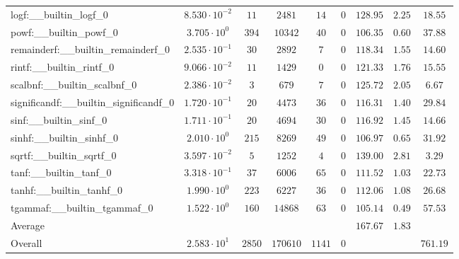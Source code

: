 \begin{tabular}{|l|c|c|c|c|c|c|c|c|}
logf:\_\_builtin\_logf\_0                 & $ 8.530 \cdot 10^{-2} $ & $ 11     $ & $ 2481   $ & $ 14   $ & $ 0   $ & $ 128.95      $ & $ 2.25    $ & $ 18.55   $ \\
powf:\_\_builtin\_powf\_0                 & $ 3.705 \cdot 10^{0}  $ & $ 394    $ & $ 10342  $ & $ 40   $ & $ 0   $ & $ 106.35      $ & $ 0.60    $ & $ 37.88   $ \\
remainderf:\_\_builtin\_remainderf\_0     & $ 2.535 \cdot 10^{-1} $ & $ 30     $ & $ 2892   $ & $ 7    $ & $ 0   $ & $ 118.34      $ & $ 1.55    $ & $ 14.60   $ \\
rintf:\_\_builtin\_rintf\_0               & $ 9.066 \cdot 10^{-2} $ & $ 11     $ & $ 1429   $ & $ 0    $ & $ 0   $ & $ 121.33      $ & $ 1.76    $ & $ 15.55   $ \\
scalbnf:\_\_builtin\_scalbnf\_0           & $ 2.386 \cdot 10^{-2} $ & $ 3      $ & $ 679    $ & $ 7    $ & $ 0   $ & $ 125.72      $ & $ 2.05    $ & $ 6.67    $ \\
significandf:\_\_builtin\_significandf\_0 & $ 1.720 \cdot 10^{-1} $ & $ 20     $ & $ 4473   $ & $ 36   $ & $ 0   $ & $ 116.31      $ & $ 1.40    $ & $ 29.84   $ \\
sinf:\_\_builtin\_sinf\_0                 & $ 1.711 \cdot 10^{-1} $ & $ 20     $ & $ 4694   $ & $ 30   $ & $ 0   $ & $ 116.92      $ & $ 1.45    $ & $ 14.66   $ \\
sinhf:\_\_builtin\_sinhf\_0               & $ 2.010 \cdot 10^{0}  $ & $ 215    $ & $ 8269   $ & $ 49   $ & $ 0   $ & $ 106.97      $ & $ 0.65    $ & $ 31.92   $ \\
sqrtf:\_\_builtin\_sqrtf\_0               & $ 3.597 \cdot 10^{-2} $ & $ 5      $ & $ 1252   $ & $ 4    $ & $ 0   $ & $ 139.00      $ & $ 2.81    $ & $ 3.29    $ \\
tanf:\_\_builtin\_tanf\_0                 & $ 3.318 \cdot 10^{-1} $ & $ 37     $ & $ 6006   $ & $ 65   $ & $ 0   $ & $ 111.52      $ & $ 1.03    $ & $ 22.73   $ \\
tanhf:\_\_builtin\_tanhf\_0               & $ 1.990 \cdot 10^{0}  $ & $ 223    $ & $ 6227   $ & $ 36   $ & $ 0   $ & $ 112.06      $ & $ 1.08    $ & $ 26.68   $ \\
tgammaf:\_\_builtin\_tgammaf\_0           & $ 1.522 \cdot 10^{0}  $ & $ 160    $ & $ 14868  $ & $ 63   $ & $ 0   $ & $ 105.14      $ & $ 0.49    $ & $ 57.53   $ \\
\hline
Average                                   & $                     $ & $        $ & $        $ & $      $ & $     $ & $ 167.67      $ & $ 1.83    $ & $         $ \\
\hline
Overall                                   & $ 2.583 \cdot 10^{1}  $ & $ 2850   $ & $ 170610 $ & $ 1141 $ & $ 0   $ & $             $ & $         $ & $ 761.19  $ \\
\hline
\end{tabular}
